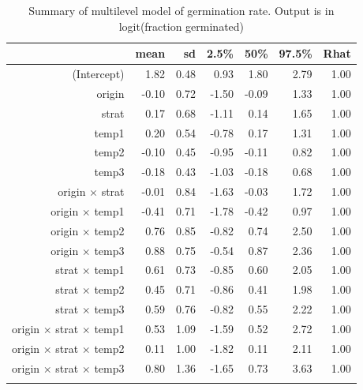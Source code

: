 \documentclass[12pt]{article}\usepackage[]{graphicx}\usepackage[]{color}
\begin{document}
\begin{longtable}{rrrrrrr}
\caption{Summary of multilevel model of germination rate. Output is in logit(fraction germinated)} \\ 
  & mean & sd & 2.5\% & 50\% & 97.5\% & Rhat \\ 
  \hline
(Intercept) & 1.82 & 0.48 & 0.93 & 1.80 & 2.79 & 1.00 \\ 
  origin & -0.10 & 0.72 & -1.50 & -0.09 & 1.33 & 1.00 \\ 
  strat & 0.17 & 0.68 & -1.11 & 0.14 & 1.65 & 1.00 \\ 
  temp1 & 0.20 & 0.54 & -0.78 & 0.17 & 1.31 & 1.00 \\ 
  temp2 & -0.10 & 0.45 & -0.95 & -0.11 & 0.82 & 1.00 \\ 
  temp3 & -0.18 & 0.43 & -1.03 & -0.18 & 0.68 & 1.00 \\ 
  origin $\times$ strat & -0.01 & 0.84 & -1.63 & -0.03 & 1.72 & 1.00 \\ 
  origin $\times$ temp1 & -0.41 & 0.71 & -1.78 & -0.42 & 0.97 & 1.00 \\ 
  origin $\times$ temp2 & 0.76 & 0.85 & -0.82 & 0.74 & 2.50 & 1.00 \\ 
  origin $\times$ temp3 & 0.88 & 0.75 & -0.54 & 0.87 & 2.36 & 1.00 \\ 
  strat $\times$ temp1 & 0.61 & 0.73 & -0.85 & 0.60 & 2.05 & 1.00 \\ 
  strat $\times$ temp2 & 0.45 & 0.71 & -0.86 & 0.41 & 1.98 & 1.00 \\ 
  strat $\times$ temp3 & 0.59 & 0.76 & -0.82 & 0.55 & 2.22 & 1.00 \\ 
  origin $\times$ strat $\times$ temp1 & 0.53 & 1.09 & -1.59 & 0.52 & 2.72 & 1.00 \\ 
  origin $\times$ strat $\times$ temp2 & 0.11 & 1.00 & -1.82 & 0.11 & 2.11 & 1.00 \\ 
  origin $\times$ strat $\times$ temp3 & 0.80 & 1.36 & -1.65 & 0.73 & 3.63 & 1.00 \\ 
  \hline
\label{tab:mod_rate}
\end{longtable}
\end{document}
